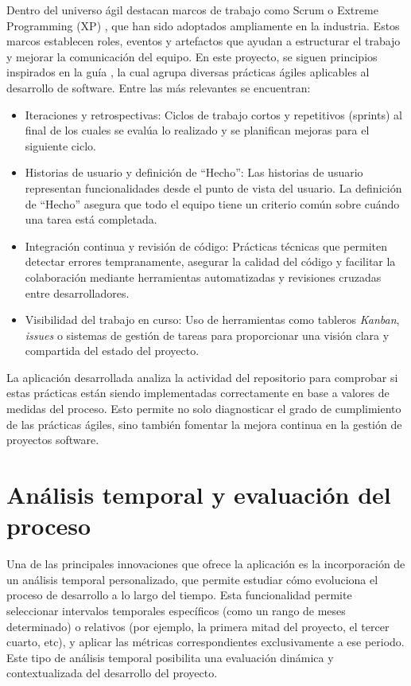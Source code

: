 Dentro del universo ágil destacan marcos de trabajo como Scrum o Extreme Programming (XP) \cite{beck2004extreme}, que han sido adoptados ampliamente en la industria. Estos marcos establecen roles, eventos y artefactos que ayudan a estructurar el trabajo y mejorar la comunicación del equipo. En este proyecto, se siguen principios inspirados en la guía \cite{agileSubwayMap}, la cual agrupa diversas prácticas ágiles aplicables al desarrollo de software. Entre las más relevantes se encuentran:

\begin{itemize}
\item Iteraciones y retrospectivas: Ciclos de trabajo cortos y repetitivos (sprints) al final de los cuales se evalúa lo realizado y se planifican mejoras para el siguiente ciclo.
\item Historias de usuario y definición de “Hecho”: Las historias de usuario representan funcionalidades desde el punto de vista del usuario. La definición de “Hecho” asegura que todo el equipo tiene un criterio común sobre cuándo una tarea está completada.
\item Integración continua y revisión de código: Prácticas técnicas que permiten detectar errores tempranamente, asegurar la calidad del código y facilitar la colaboración mediante herramientas automatizadas y revisiones cruzadas entre desarrolladores.
\item Visibilidad del trabajo en curso: Uso de herramientas como tableros \textit{Kanban}, \textit{issues} o sistemas de gestión de tareas para proporcionar una visión clara y compartida del estado del proyecto.
\end{itemize}

La aplicación desarrollada analiza la actividad del repositorio para comprobar si estas prácticas están siendo implementadas correctamente en base a valores de medidas del proceso. Esto permite no solo diagnosticar el grado de cumplimiento de las prácticas ágiles, sino también fomentar la mejora continua en la gestión de proyectos software.

\section{Análisis temporal y evaluación del proceso}
Una de las principales innovaciones que ofrece la aplicación es la incorporación de un análisis temporal personalizado, que permite estudiar cómo evoluciona el proceso de desarrollo a lo largo del tiempo. Esta funcionalidad permite seleccionar intervalos temporales específicos (como un rango de meses determinado) o relativos (por ejemplo, la primera mitad del proyecto, el tercer cuarto, etc), y aplicar las métricas correspondientes exclusivamente a ese periodo. Este tipo de análisis temporal posibilita una evaluación dinámica y contextualizada del desarrollo del proyecto.


